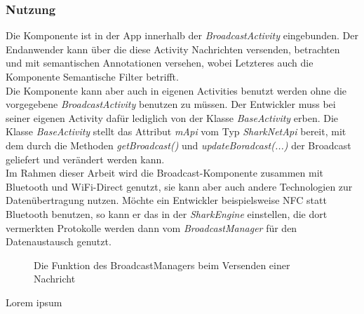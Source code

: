 \subsubsection{Nutzung}
Die Komponente ist in der App innerhalb der \textit{BroadcastActivity} eingebunden. Der Endanwender kann über die diese Activity Nachrichten versenden, betrachten und mit semantischen Annotationen versehen, wobei Letzteres auch die Komponente Semantische Filter betrifft.
\\Die Komponente kann aber auch in eigenen Activities benutzt werden ohne die vorgegebene \textit{BroadcastActivity} benutzen zu müssen. Der Entwickler muss bei seiner eigenen Activity dafür lediglich von der Klasse \textit{BaseActivity} erben. Die Klasse \textit{BaseActivity} stellt das Attribut \textit{mApi} vom Typ \textit{SharkNetApi} bereit, mit dem durch die Methoden \textit{getBroadcast()} und \textit{updateBoradcast(...)} der Broadcast geliefert und verändert werden kann.
\\Im Rahmen dieser Arbeit wird die Broadcast-Komponente zusammen mit Bluetooth und WiFi-Direct genutzt, sie kann aber auch andere Technologien zur Datenübertragung nutzen. Möchte ein Entwickler beispielsweise NFC statt Bluetooth benutzen, so kann er das in der \textit{SharkEngine} einstellen, die dort vermerkten Protokolle werden dann vom \textit{BroadcastManager} für den Datenaustausch genutzt.
\begin{figure}[H]
	\centering
	\hspace*{1cm}
	\caption{Die Funktion des BroadcastManagers beim Versenden einer Nachricht}
	\label{fig:sendOperation}
\end{figure}
Lorem ipsum

